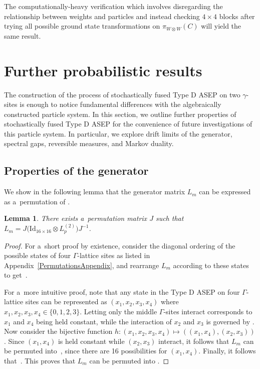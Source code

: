 \documentclass[pdftex]{sigma}
\numberwithin{equation}{section}
\newtheorem{Lemma}[Theorem]{Lemma}
\theoremstyle{definition}
\begin{document}
The computationally-heavy verification which involves disregarding the relationship between weights and particles and instead checking $4 \times 4$ blocks after trying all possible ground state transformations on $\pi_{W \otimes W}(C)$ will yield the same result.

\section{Further probabilistic results} \label{section--ProbProofs}

The construction of the process of stochastically fused Type D ASEP on two $\gamma$-sites is enough to notice fundamental differences with the algebraically constructed particle system. In this section, we outline further properties of stochastically fused Type D ASEP for the convenience of future investigations of this particle system. In particular, we explore drift limits of the generator, spectral gaps, reversible measures, and Markov duality.

\subsection{Properties of the generator}
We show in the following lemma that the generator matrix $L_m$ can be expressed as a~permutation of .

\begin{Lemma}
 \label{MiddleRearrange}
 There exists a~permutation matrix $J$ such that $L_m = J\bigl(\mathrm{Id}_{16 \times 16} \otimes L_p^{(2)}\bigr)J^{-1}$.
\end{Lemma}

\begin{proof}
 \label{MiddleRearrangeProof}
 For a~short proof by existence, consider the diagonal ordering of the possible states of four $\Gamma$-lattice sites as listed in Appendix~\ref{PermutationsAppendix}, and rearrange $L_m$ according to these states to get~.

 For a~more intuitive proof, note that any state in the Type D ASEP on four $\Gamma$-lattice sites can be represented as $(x_1,x_2,x_3,x_4)$ where $x_1,x_2,x_3,x_4 \in \{0,1,2,3\}$. Letting only the middle $\Gamma$-sites interact corresponds to $x_1$ and $x_4$ being held constant, while the interaction of $x_2$ and $x_3$ is governed by . Now consider the bijective function $h\colon(x_1,x_2,x_3,x_4) \mapsto ((x_1,x_4),(x_2,x_3))$. Since $(x_1,x_4)$ is held constant while $(x_2,x_3)$ interact, it follows that $L_m$ can be permuted into~, since there are 16 possibilities for $(x_1,x_4)$. Finally, it follows that~. This proves that $L_m$ can be permuted into .
\end{proof}
\end{document}

